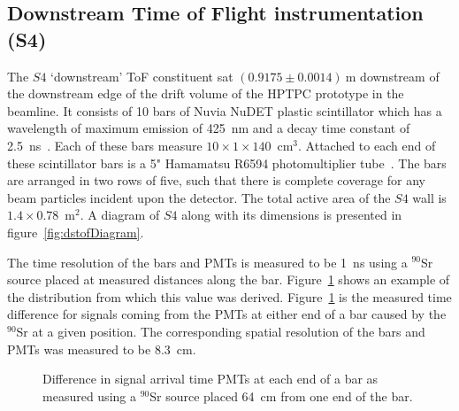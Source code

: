 \subsection{Downstream Time of Flight instrumentation (S4)}
\label{subsec:s4Exp}
The $\mathit{S4}$ `downstream' ToF constituent sat $(0.9175 \pm 0.0014)~\text{m}$ downstream of the downstream edge of the drift volume of the HPTPC prototype in the beamline.
It consists of 10 bars of Nuvia NuDET plastic scintillator which has a wavelength of maximum emission of 425~nm and a decay time constant of 2.5~ns~\cite{Nuvia}.
Each of these bars measure $10 \times 1 \times 140$~cm$^3$. 
Attached to each end of these scintillator bars is a 5" Hamamatsu R6594 photomultiplier tube~\cite{Hamamatsu}.
The bars are arranged in two rows of five, such that there is complete coverage for any beam particles incident upon the detector.
The total active area of the $\mathit{S4}$ wall is $1.4 \times 0.78$~m$^2$.
A diagram of $\mathit{S4}$ along with its dimensions is presented in figure~\ref{fig:dstofDiagram}.

The time resolution of the bars and PMTs is measured to be 1~ns using a $^{90}$Sr source placed at measured distances along the bar.
Figure~\ref{fig:s4Res} shows an example of the distribution from which this value was derived.
Figure~\ref{fig:s4Res} is the measured time difference for signals coming from the PMTs at either end of a bar caused by the $^{90}$Sr at a given position.
The corresponding spatial resolution of the bars and PMTs was measured to be 8.3~cm.

\begin{figure}[ht]
  \begin{adjustbox}{max totalsize={.6\textwidth}{.5\textheight},center}
    
  \end{adjustbox}
  \caption{Difference in signal arrival time PMTs at each end of a bar as measured using a $^{90}$Sr source placed 64~cm from one end of the bar.}
  \label{fig:s4Res}	
\end{figure}

